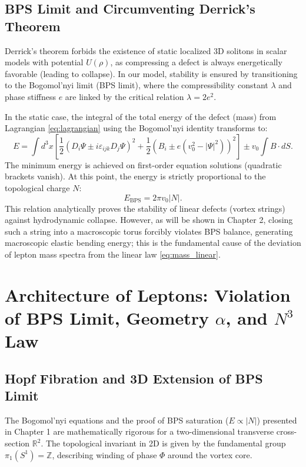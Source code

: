 \documentclass[12pt,a4paper]{article}
\begin{document}
\subsection{BPS Limit and Circumventing Derrick's Theorem}
Derrick's theorem forbids the existence of static localized 3D solitons in scalar models with potential $U(\rho)$, as compressing a defect is always energetically favorable (leading to collapse). In our model, stability is ensured by transitioning to the Bogomol'nyi limit (BPS limit), where the compressibility constant $\lambda$ and phase stiffness $e$ are linked by the critical relation $\lambda = 2e^2$.

In the static case, the integral of the total energy of the defect (mass) from Lagrangian \eqref{eq:lagrangian} using the Bogomol'nyi identity transforms to:
\begin{equation}
    E = \int d^3x \left[ \frac{1}{2}(D_i\Psi \pm i\varepsilon_{ijk}D_j\Psi)^2 + \frac{1}{2}\left(B_i \pm e(v_0^2-|\Psi|^2)\right)^2 \right] \pm v_0 \int B \cdot dS.
    \label{eq:static_energy}
\end{equation}
The minimum energy is achieved on first-order equation solutions (quadratic brackets vanish). At this point, the energy is strictly proportional to the topological charge $N$:
\begin{equation}
    E_{\text{BPS}} = 2\pi v_0 |N|.
    \label{eq:mass_linear}
\end{equation}
This relation analytically proves the stability of linear defects (vortex strings) against hydrodynamic collapse. However, as will be shown in Chapter 2, closing such a string into a macroscopic torus forcibly violates BPS balance, generating macroscopic elastic bending energy; this is the fundamental cause of the deviation of lepton mass spectra from the linear law \eqref{eq:mass_linear}.

\section{Architecture of Leptons: Violation of BPS Limit, Geometry $\alpha$, and $N^3$ Law}

\subsection{Hopf Fibration and 3D Extension of BPS Limit}
The Bogomol'nyi equations and the proof of BPS saturation ($E \propto |N|$) presented in Chapter 1 are mathematically rigorous for a two-dimensional transverse cross-section $\mathbb{R}^2$. The topological invariant in 2D is given by the fundamental group $\pi_1(S^1)=\mathbb{Z}$, describing winding of phase $\Phi$ around the vortex core.
\end{document}
